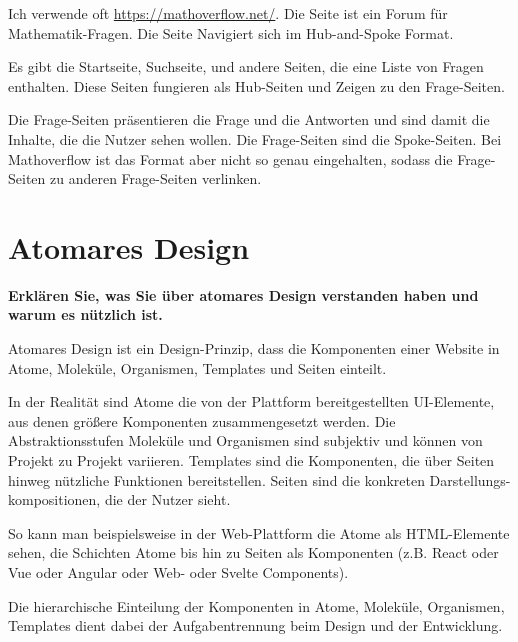\documentclass[a4paper,12pt]{article}
\begin{document}
Ich verwende oft \url{https://mathoverflow.net/}. Die Seite ist ein Forum für
Mathematik-Fragen. Die Seite Navigiert sich im Hub-and-Spoke Format.

Es gibt die Startseite, Suchseite, und andere Seiten, die eine Liste von Fragen
enthalten. Diese Seiten fungieren als Hub-Seiten und Zeigen zu den Frage-Seiten.

Die Frage-Seiten präsentieren die Frage und die Antworten und sind damit die Inhalte, die
die Nutzer sehen wollen. Die Frage-Seiten sind die Spoke-Seiten. Bei Mathoverflow
ist das Format aber nicht so genau eingehalten, sodass die Frage-Seiten zu anderen
Frage-Seiten verlinken.

\section{Atomares Design}

\textbf{Erklären Sie, was Sie über atomares Design verstanden haben
  und warum es nützlich ist.}

Atomares Design ist ein Design-Prinzip, dass die Komponenten einer Website
in Atome, Moleküle, Organismen, Templates und Seiten einteilt.

In der Realität sind Atome die von der Plattform bereitgestellten UI-Elemente,
aus denen größere Komponenten zusammengesetzt werden. Die Abstraktionsstufen Moleküle
und Organismen sind subjektiv und können von Projekt zu Projekt variieren. Templates
sind die Komponenten, die über Seiten hinweg nützliche Funktionen bereitstellen. Seiten
sind die konkreten Darstellungs-kompositionen, die der Nutzer sieht.

So kann man beispielsweise in der Web-Plattform die Atome als HTML-Elemente sehen,
die Schichten Atome bis hin zu Seiten als Komponenten
(z.B. React oder Vue oder Angular oder Web- oder Svelte Components).

Die hierarchische Einteilung der Komponenten in Atome, Moleküle, Organismen, Templates
dient dabei der Aufgabentrennung beim Design und der Entwicklung.
\end{document}
